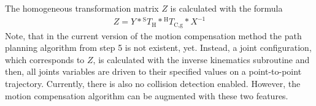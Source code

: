 The homogeneous transformation matrix $Z$ is calculated with the formula
\begin{align}
Z = Y\ast{^{\text{S}}T_{\text{H}}}\ast{^{\text{H}}T_{\text{C,g}}}\ast X^{-1}
\end{align} 
Note, that in the current version of the motion compensation method the path planning algorithm from step 5 is not existent, yet. Instead, a joint configuration, which corresponds to $Z$, is calculated with the inverse kinematics subroutine and then, all joints variables are driven to their specified values on a point-to-point trajectory. Currently, there is also no collision detection enabled. However, the motion compensation algorithm can be augmented with these two features. 